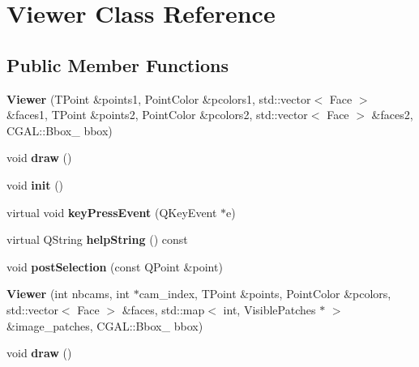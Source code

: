 \hypertarget{class_viewer}{
\section{Viewer Class Reference}
\label{class_viewer}
}
\subsection*{Public Member Functions}
\begin{DoxyCompactItemize}
\item 
\hypertarget{class_viewer_af0981018516308a90317d50e42588d74}{
{\bfseries Viewer} (TPoint \&points1, PointColor \&pcolors1, std::vector$<$ Face $>$ \&faces1, TPoint \&points2, PointColor \&pcolors2, std::vector$<$ Face $>$ \&faces2, CGAL::Bbox\_ bbox)}
\label{class_viewer_af0981018516308a90317d50e42588d74}

\item 
\hypertarget{class_viewer_a9ce9d06343c4e089ac76b19f78fe29e4}{
void {\bfseries draw} ()}
\label{class_viewer_a9ce9d06343c4e089ac76b19f78fe29e4}

\item 
\hypertarget{class_viewer_a255cc2d6f55fc8565e614618d41589b1}{
void {\bfseries init} ()}
\label{class_viewer_a255cc2d6f55fc8565e614618d41589b1}

\item 
\hypertarget{class_viewer_a151e08b88af52eb4a1b80de42b5c6d8e}{
virtual void {\bfseries keyPressEvent} (QKeyEvent $\ast$e)}
\label{class_viewer_a151e08b88af52eb4a1b80de42b5c6d8e}

\item 
\hypertarget{class_viewer_a1f056d8d3c4e38d22f8ec52e9bd5a5d3}{
virtual QString {\bfseries helpString} () const }
\label{class_viewer_a1f056d8d3c4e38d22f8ec52e9bd5a5d3}

\item 
\hypertarget{class_viewer_aed885858645c43559de13e29ec0735a5}{
void {\bfseries postSelection} (const QPoint \&point)}
\label{class_viewer_aed885858645c43559de13e29ec0735a5}

\item 
\hypertarget{class_viewer_aa1727b6ec8abf7fdf111763197e832b4}{
{\bfseries Viewer} (int nbcams, int $\ast$cam\_\-index, TPoint \&points, PointColor \&pcolors, std::vector$<$ Face $>$ \&faces, std::map$<$ int, VisiblePatches $\ast$ $>$ \&image\_\-patches, CGAL::Bbox\_ bbox)}
\label{class_viewer_aa1727b6ec8abf7fdf111763197e832b4}

\item 
\hypertarget{class_viewer_a9ce9d06343c4e089ac76b19f78fe29e4}{
void {\bfseries draw} ()}
\label{class_viewer_a9ce9d06343c4e089ac76b19f78fe29e4}


\end{DoxyCompactItemize}
